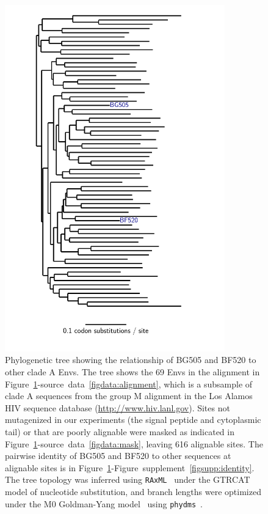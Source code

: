 \documentclass[9pt]{elife}
\begin{document}
\begin{figure}
\centerline{\includegraphics[clip=true, trim= 1in 0in 1.4in 0in, angle=-90, width=0.85\textwidth]{figures/tree_plot.pdf}}
\caption{\label{fig:tree}
Phylogenetic tree showing the relationship of BG505 and BF520 to other clade A Envs.
The tree shows the 69 Envs in the alignment in Figure~\ref{fig:tree}-source~data~\ref{figdata:alignment}, which is a subsample of clade A sequences from the group M alignment in the Los Alamos HIV sequence database (\url{http://www.hiv.lanl.gov}).
Sites not mutagenized in our experiments (the signal peptide and cytoplasmic tail) or that are poorly alignable were masked as indicated in Figure~\ref{fig:tree}-source~data~\ref{figdata:mask}, leaving 616 alignable sites.
The pairwise identity of BG505 and BF520 to other sequences at alignable sites is in Figure~\ref{fig:tree}-Figure~supplement~\ref{figsupp:identity}.
The tree topology was inferred using \texttt{RAxML}~\citep{stamatakis2014raxml} under the GTRCAT model of nucleotide substitution, and branch lengths were optimized under the M0 Goldman-Yang model~\citep{yang2000codon} using \texttt{phydms}~\citep{hilton2017phydms}.
}
\end{figure}
\end{document}
